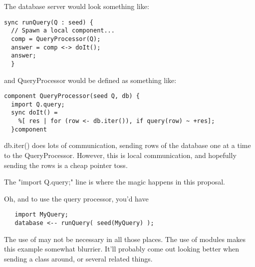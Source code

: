 The database server would look something like: 

\begin{lstlisting}
sync runQuery(Q : seed) {
  // Spawn a local component...
  comp = QueryProcessor(Q);
  answer = comp <-> doIt();
  answer;
  }
\end{lstlisting}

and QueryProcessor would be defined as something like: 

\begin{lstlisting}
component QueryProcessor(seed Q, db) {
  import Q.query;
  sync doIt() =
    %[ res | for (row <- db.iter()), if query(row) ~ +res];
  }component
\end{lstlisting}

db.iter() does lots of communication, sending rows of the database one at a
time to the QueryProcessor.  However, this is local communication, and
hopefully sending the rows is a cheap pointer toss.

The "import Q.query;" line is where the magic happens in this proposal.

Oh, and to use the query processor, you'd have
\begin{lstlisting} 
   import MyQuery;
   database <-- runQuery( seed(MyQuery) );
\end{lstlisting}

The use of  may not be necessary in all those places.  
The use of modules makes this example somewhat blurrier.  It'll probably come
out looking better when sending a class around, or several related things.  